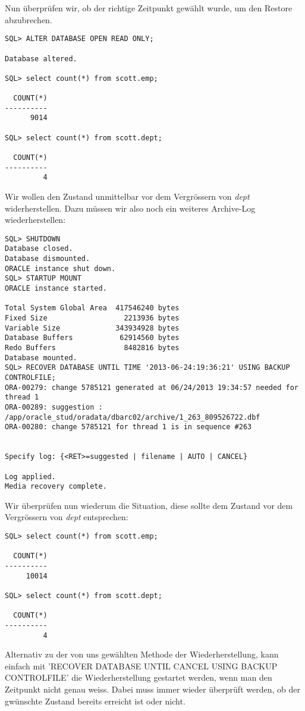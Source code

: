 \documentclass[11pt,a4paper,parskip=half]{scrartcl}
\begin{document}
Nun überprüfen wir, ob der richtige Zeitpunkt gewählt wurde, um den Restore abzubrechen.

\begin{lstlisting}
SQL> ALTER DATABASE OPEN READ ONLY;

Database altered.

SQL> select count(*) from scott.emp;

  COUNT(*)
----------
      9014

SQL> select count(*) from scott.dept;

  COUNT(*)
----------
         4
\end{lstlisting}

Wir wollen den Zustand unmittelbar vor dem Vergrössern von \emph{dept} widerherstellen. Dazu müssen wir also noch ein weiteres Archive-Log wiederherstellen:
\begin{lstlisting}
SQL> SHUTDOWN
Database closed.
Database dismounted.
ORACLE instance shut down.
SQL> STARTUP MOUNT
ORACLE instance started.

Total System Global Area  417546240 bytes
Fixed Size                  2213936 bytes
Variable Size             343934928 bytes
Database Buffers           62914560 bytes
Redo Buffers                8482816 bytes
Database mounted.
SQL> RECOVER DATABASE UNTIL TIME '2013-06-24:19:36:21' USING BACKUP CONTROLFILE;
ORA-00279: change 5785121 generated at 06/24/2013 19:34:57 needed for thread 1
ORA-00289: suggestion :
/app/oracle_stud/oradata/dbarc02/archive/1_263_809526722.dbf
ORA-00280: change 5785121 for thread 1 is in sequence #263


Specify log: {<RET>=suggested | filename | AUTO | CANCEL}

Log applied.
Media recovery complete.
\end{lstlisting}

Wir überprüfen nun wiederum die Situation, diese sollte dem Zustand vor dem Vergrössern von \emph{dept} entsprechen:

\begin{lstlisting}
SQL> select count(*) from scott.emp;

  COUNT(*)
----------
     10014

SQL> select count(*) from scott.dept;

  COUNT(*)
----------
         4
\end{lstlisting}

Alternativ zu der von uns gewählten Methode der Wiederherstellung, kann einfach mit 'RECOVER DATABASE UNTIL CANCEL USING BACKUP CONTROLFILE' die Wiederherstellung gestartet werden, wenn man den Zeitpunkt nicht genau weiss. Dabei muss immer wieder überprüft werden, ob der gwünschte Zustand bereits erreicht ist oder nicht.
\end{document}
